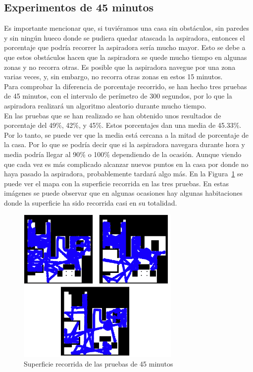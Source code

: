 \subsection{Experimentos de 45 minutos}
Es importante mencionar que, si tuviéramos una casa sin obstáculos, sin paredes y sin ningún hueco donde se pudiera quedar atascada la aspiradora, entonces el porcentaje que podría recorrer la aspiradora sería mucho mayor. Esto se debe a que estos obstáculos hacen que la aspiradora se quede mucho tiempo en algunas zonas y no recorra otras. Es posible que la aspiradora navegue por una zona varias veces, y, sin embargo, no recorra otras zonas en estos 15 minutos.\\

Para comprobar la diferencia de porcentaje recorrido, se han hecho tres pruebas de 45 minutos, con el intervalo de perímetro de 300 segundos, por lo que la aspiradora realizará un algoritmo aleatorio durante mucho tiempo. \\

En las pruebas que se han realizado se han obtenido unos resultados de porcentaje del 49\%, 42\%, y 45\%. Estos porcentajes dan una media de 45.33\%. Por lo tanto, se puede ver que la media está cercana a la mitad de porcentaje de la casa. Por lo que se podría decir que si la aspiradora navegara durante hora y media podría llegar al 90\% o 100\% dependiendo de la ocasión. Aunque viendo que cada vez es más complicado alcanzar nuevos puntos en la casa por donde no haya pasado la aspiradora, probablemente tardará algo más. En la Figura~\ref{fig.Referee_45MIN} se puede ver el mapa con la superficie recorrida en las tres pruebas. En estas imágenes se puede observar que en algunas ocasiones hay algunas habitaciones donde la superficie ha sido recorrida casi en su totalidad.\\

\begin{figure}[H]
  \begin{center}
    \includegraphics[width=0.7\textwidth]{figures/Vacuum/Referee_45MIN.png}
		\caption{Superficie recorrida de las pruebas de 45 minutos}
		\label{fig.Referee_45MIN}
		\end{center}
\end{figure}